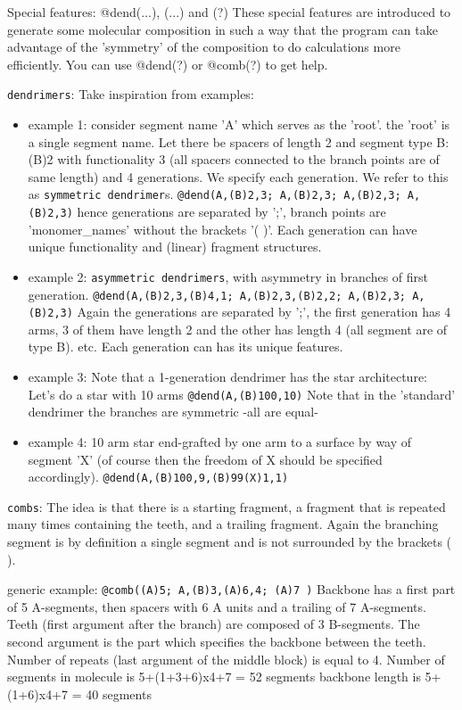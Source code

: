 \documentclass{article}
\begin{document}
\begin{itemize}
Special features: @dend(...), \@comb(...) and \@water(?) These special features are introduced to generate some molecular composition in such a way that the program can take advantage of the 'symmetry' of the composition to do calculations more efficiently. You can use @dend(?) or @comb(?) to get help.

{\tt dendrimers}: Take inspiration from examples:

\begin{itemize}
\item example 1: consider segment name 'A' which serves as the 'root'. the 'root' is a single segment name. Let there be spacers of length 2 and segment type B:  (B)2 with functionality 3 (all spacers connected to the branch points are of same length) and 4 generations. We specify each generation. We refer to this as {\tt symmetric dendrimer}s. 
 {\tt @dend(A,(B)2,3; A,(B)2,3; A,(B)2,3; A,(B)2,3)}
 hence generations are separated by ';', branch points are 'monomer\_names' without the brackets '( )'. Each generation can have unique functionality and (linear) fragment structures.
 
 \item example 2: {\tt asymmetric dendrimers}, with asymmetry in branches of first generation.
 {\tt @dend(A,(B)2,3,(B)4,1; A,(B)2,3,(B)2,2; A,(B)2,3; A,(B)2,3)}
 Again the generations are separated by ';', the first generation has 4 arms, 3 of them have length 2 and the other has length 4 (all segment are of type B). etc. Each generation can has its unique features.
 
 \item example 3: Note that a 1-generation dendrimer has the star architecture: Let's do a star with 10 arms
{\tt  @dend(A,(B)100,10)}
 Note that in the 'standard' dendrimer the branches are symmetric -all are equal-
 
 \item example 4: 10 arm star end-grafted by one arm to a surface by way of segment 'X' (of course then the freedom of X should be specified accordingly).
 {\tt @dend(A,(B)100,9,(B)99(X)1,1)}
 
\end{itemize}

{\tt combs}: The idea is that there is a starting fragment, a fragment that is repeated many times containing the teeth, and a trailing fragment.  Again the branching segment is by definition a single segment and is not surrounded by the  brackets ( ).   

generic example: {\tt @comb((A)5; A,(B)3,(A)6,4; (A)7 )}
Backbone has a first part of 5 A-segments, then spacers with 6 A units and a trailing of 7 A-segments. Teeth (first argument after the branch) are composed of 3 B-segments. The second argument is the part which specifies the backbone between the teeth. Number of repeats (last argument of the middle block) is equal to 4.
Number of segments in molecule is 5+(1+3+6)x4+7 = 52 segments
backbone length is 5+(1+6)x4+7 = 40 segments


\end{itemize}
\end{document}
